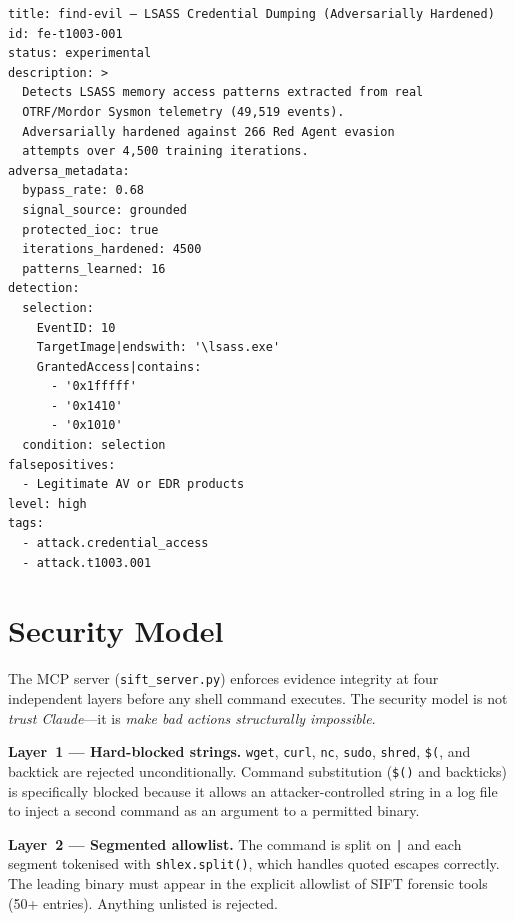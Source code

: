 \documentclass[sigconf, nonacm]{acmart}
\begin{document}
\begin{listing}[ht]
\begin{verbatim}
title: find-evil — LSASS Credential Dumping (Adversarially Hardened)
id: fe-t1003-001
status: experimental
description: >
  Detects LSASS memory access patterns extracted from real
  OTRF/Mordor Sysmon telemetry (49,519 events).
  Adversarially hardened against 266 Red Agent evasion
  attempts over 4,500 training iterations.
adversa_metadata:
  bypass_rate: 0.68
  signal_source: grounded
  protected_ioc: true
  iterations_hardened: 4500
  patterns_learned: 16
detection:
  selection:
    EventID: 10
    TargetImage|endswith: '\lsass.exe'
    GrantedAccess|contains:
      - '0x1fffff'
      - '0x1410'
      - '0x1010'
  condition: selection
falsepositives:
  - Legitimate AV or EDR products
level: high
tags:
  - attack.credential_access
  - attack.t1003.001
\end{verbatim}
\caption{Adversarially hardened Sigma rule for T1003.001 with embedded bypass
rate. The \texttt{adversa\_metadata} block gives analysts a
quantitative hardening metric absent from all manually authored rules.
\texttt{GrantedAccess} values (\texttt{0x1fffff}, \texttt{0x1410},
\texttt{0x1010}) were extracted by grounded learning from real Mordor
LSASS-access events—not hand-authored.}
\label{lst:sigma}
\end{listing}

\section{Security Model}
\label{sec:security}

The MCP server (\texttt{sift\_server.py}) enforces evidence integrity
at four independent layers before any shell command executes.
The security model is not \emph{trust Claude}—it is \emph{make bad
actions structurally impossible}.

\textbf{Layer~1 — Hard-blocked strings.} \texttt{wget}, \texttt{curl},
\texttt{nc}, \texttt{sudo}, \texttt{shred}, \texttt{\$(},
and backtick are rejected unconditionally. Command substitution
(\texttt{\$()} and backticks) is specifically blocked because it allows
an attacker-controlled string in a log file to inject a second command
as an argument to a permitted binary.

\textbf{Layer~2 — Segmented allowlist.} The command is split on
\texttt{|} and each segment tokenised with \texttt{shlex.split()},
which handles quoted escapes correctly. The leading binary must appear
in the explicit allowlist of SIFT forensic tools (50+ entries).
Anything unlisted is rejected.
\end{document}
